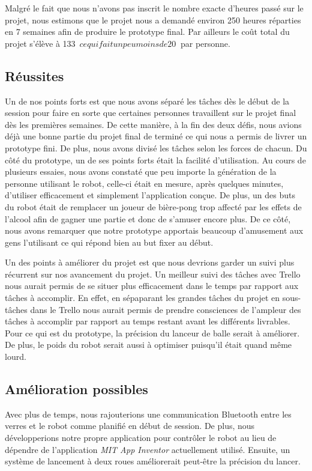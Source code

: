 Malgré le fait que nous n'avons pas inscrit le nombre exacte d'heures passé sur le projet, nous estimons que le projet nous a demandé environ 250 heures réparties en 7 semaines afin de produire le prototype final.
Par ailleurs le coût total du projet s'élève à 133~$ ce qui fait un peu moins de 20~$ par personne.

\subsection{Réussites}

Un de nos points forts est que nous avons séparé les tâches dès le début de la session pour faire en sorte que certaines personnes travaillent sur le projet final dès les premières semaines.
De cette manière, à la fin des deux défis, nous avions déjà une bonne partie du projet final de terminé ce qui nous a permis de livrer un prototype fini.
De plus, nous avons divisé les tâches selon les forces de chacun.
Du côté du prototype, un de ses points forts était la facilité d'utilisation.
Au cours de plusieurs essaies, nous avons constaté que peu importe la génération de la personne utilisant le robot, celle-ci était en mesure, après quelques minutes, d'utiliser efficacement et simplement l'application conçue.
De plus, un des buts du robot était de remplacer un joueur de bière-pong trop affecté par les effets de l'alcool afin de gagner une partie et donc de s'amuser encore plus.
De ce côté, nous avons remarquer que notre prototype apportais beaucoup d'amusement aux gens l'utilisant ce qui répond bien au but fixer au début.


Un des points à améliorer du projet est que nous devrions garder un suivi plus récurrent sur nos avancement du projet.
Un meilleur suivi des tâches avec Trello nous aurait permis de se situer plus efficacement dans le temps par rapport aux tâches à accomplir.
En effet, en sépaparant les grandes tâches du projet en sous-tâches dans le Trello nous aurait permis de prendre consciences de l'ampleur des tâches à accomplir par rapport au temps restant avant les différents livrables.
Pour ce qui est du prototype, la précision du lanceur de balle serait à améliorer.
De plus, le poids du robot serait aussi à optimiser puisqu'il était quand même lourd.


\subsection{Amélioration possibles}


Avec plus de temps, nous rajouterions une communication Bluetooth entre les verres et le robot comme planifié en début de session.
De plus, nous développerions notre propre application pour contrôler le robot au lieu de dépendre de l’application \emph{MIT App Inventor} actuellement utilisé.
Ensuite, un système de lancement à deux roues améliorerait peut-être la précision du lancer.
